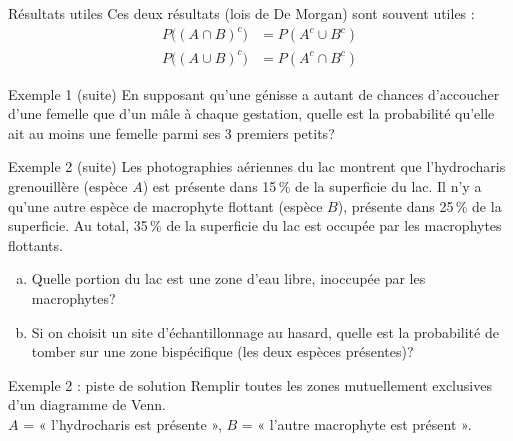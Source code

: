 \documentclass{BeamerTemplate}
\newcommand{\cadreVenn}{\draw (0,0) rectangle (4,3); \node at (3.7,2.7) {\scriptsize $\Omega$};}
\newcommand{\contourAB}{%
  \draw (1.5,1.5) circle (1); \node at (0.6,2.4) {$A$};
  \draw (2.5,1.5) circle (1); \node at (3.4,2.4) {$B$};}
\begin{document}
\begin{frame}[t]{Résultats utiles}
  Ces deux résultats (lois de De Morgan) sont souvent utiles :
  \begin{align*}
    P\big((A \cap B)^c\big) &= P(A^c \cup B^c) \\
    P\big((A \cup B)^c\big) &= P(A^c \cap B^c)
  \end{align*}

\end{frame}

\begin{frame}[t]{Exemple 1 (suite)}
  En supposant qu'une génisse a autant de chances d'accoucher d'une femelle
  que d'un mâle à chaque gestation, quelle est la probabilité qu'elle ait
  \alert{au moins une femelle} parmi ses 3 premiers petits?

  \vspace{3cm}
\end{frame}

\begin{frame}[t]{Exemple 2 (suite)}
  \small
  Les photographies aériennes du lac montrent que l'hydrocharis grenouillère
  (espèce $A$) est présente dans 15\,\% de la superficie du lac. Il n'y a
  qu'une autre espèce de macrophyte flottant (espèce $B$), présente dans
  25\,\% de la superficie. Au total, 35\,\% de la superficie du lac est
  occupée par les macrophytes flottants.

  \begin{enumerate}[a)]\itemsep 1.1cm
    \item Quelle portion du lac est une zone d'eau libre, inoccupée par les
      macrophytes?
    \item Si on choisit un site d'échantillonnage au hasard, quelle est la
      probabilité de tomber sur une zone bispécifique (les deux espèces
      présentes)?
  \end{enumerate}
\end{frame}

\begin{frame}[t]{Exemple 2 : piste de solution}
  Remplir toutes les zones mutuellement exclusives d'un diagramme de Venn.\\
  $A$ = « l'hydrocharis est présente », $B$ = « l'autre macrophyte est présent ».

  \bigskip
  \centering
\end{frame}
\end{document}

